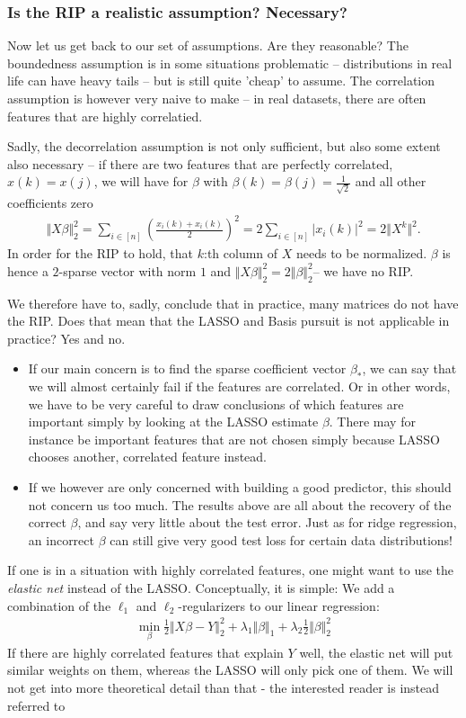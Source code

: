 \documentclass{article}
\newcommand{\abs}[1]{\vert #1 \vert}
\newcommand{\norm}[1]{\Vert #1 \Vert}
\begin{document}
\subsubsection{Is the RIP a realistic assumption? Necessary?} Now let us get back to our set of assumptions. Are they reasonable? The boundedness assumption is in some situations problematic -- distributions in real life can have heavy tails -- but is still quite 'cheap' to assume. The correlation assumption is however very naive to make -- in real datasets, there are often features that are highly correlatied.

Sadly, the decorrelation assumption is not only sufficient, but also some extent also necessary -- if there are two features that are perfectly correlated, $x(k)=x(j)$, we will have for $\beta$ with $\beta(k)=\beta(j)= \tfrac{1}{\sqrt{2}}$ and all other coefficients zero
\begin{align*}
    \norm{X\beta}_2^2 = \sum_{i \in [n]} ( \frac{x_i(k)+x_i(k)}{2})^2  = 2 \sum_{i\in [n]}\abs{x_i(k)}^2 = 2 \norm{X^k}^2.
\end{align*}
In order for the RIP to hold, that $k$:th column of $X$ needs to be normalized. $\beta$ is hence a $2$-sparse vector with norm $1$ and $\norm{X\beta}_2^2=2\norm{\beta}_2^2$-- we have no RIP.

We therefore have to, sadly, conclude that  in practice, many matrices do not have the RIP. Does that mean that the LASSO and Basis pursuit is not applicable in practice? Yes and no.
\begin{itemize}
    \item If our main concern is to find the sparse coefficient vector $\beta_*$, we can say that we will almost certainly fail if the features are correlated. Or in other words, we have to be very careful to draw conclusions of which features are important simply by looking at the LASSO estimate $\beta$. There may for instance be important features that are not chosen simply because LASSO chooses another, correlated feature instead.
    \item If we however are only concerned with building a good predictor, this should not concern us too much. The results above are all about the recovery of the correct $\beta$, and say very little about the test error. Just as for ridge regression, an incorrect $\beta$ can still give very good test loss for certain data distributions! 
\end{itemize}

If one is in a situation with highly correlated features, one might want to use the \emph{elastic net} instead of the LASSO. Conceptually, it is simple: We add a combination of the $\ell_1$ and $\ell_2$-regularizers to our linear regression:
\begin{align*}
    \min_{\beta} \tfrac{1}{2}\norm{X\beta-Y}_2^2 + \lambda_1 \norm{\beta}_1 + \lambda_2 \tfrac{1}{2}\norm{\beta}_2^2
\end{align*}
If there are highly correlated features that explain $Y$ well, the elastic net will put similar weights on them, whereas the LASSO will only pick one of them. We will not get into more theoretical detail than that - the interested reader is instead referred to \cite{zou2005regularization}
\end{document}
